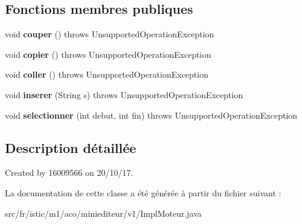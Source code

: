 \subsection*{Fonctions membres publiques}
\begin{DoxyCompactItemize}
\item 
\mbox{\label{classfr_1_1istic_1_1m1_1_1aco_1_1miniediteur_1_1v1_1_1ImplMoteur_accc285eb40fcf3dd10d9e759572693b4}} 
void {\bfseries couper} ()  throws Unsupported\+Operation\+Exception 
\item 
\mbox{\label{classfr_1_1istic_1_1m1_1_1aco_1_1miniediteur_1_1v1_1_1ImplMoteur_a8878eeb5dd3b768bf3cdad749eb4bdbe}} 
void {\bfseries copier} ()  throws Unsupported\+Operation\+Exception 
\item 
\mbox{\label{classfr_1_1istic_1_1m1_1_1aco_1_1miniediteur_1_1v1_1_1ImplMoteur_aabba2aa78984cb79aa82eec8c357d19b}} 
void {\bfseries coller} ()  throws Unsupported\+Operation\+Exception 
\item 
\mbox{\label{classfr_1_1istic_1_1m1_1_1aco_1_1miniediteur_1_1v1_1_1ImplMoteur_a28a7d1b3a7e6df691897ccf02f5fc881}} 
void {\bfseries inserer} (String s)  throws Unsupported\+Operation\+Exception 
\item 
\mbox{\label{classfr_1_1istic_1_1m1_1_1aco_1_1miniediteur_1_1v1_1_1ImplMoteur_ac4aa178459855e2a146417d12deb9011}} 
void {\bfseries selectionner} (int debut, int fin)  throws Unsupported\+Operation\+Exception 
\end{DoxyCompactItemize}


\subsection{Description détaillée}
Created by 16009566 on 20/10/17. 

La documentation de cette classe a été générée à partir du fichier suivant \+:\begin{DoxyCompactItemize}
\item 
src/fr/istic/m1/aco/miniediteur/v1/Impl\+Moteur.\+java\end{DoxyCompactItemize}
